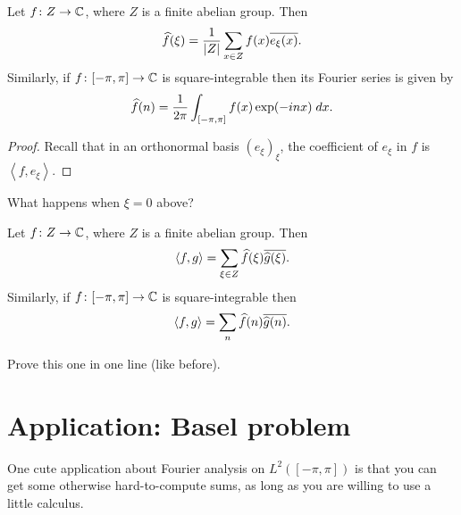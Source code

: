 \begin{corollary}
	Let $f \colon Z \to \mathbb C$, where $Z$ is a finite abelian group.
	Then \[ \widehat f(\xi) = \frac{1}{|Z|} \sum_{x \in Z} f(x) \overline{e_\xi(x)}. \]
	Similarly, if $f \colon [-\pi, \pi] \to \mathbb C$ is square-integrable then
	its Fourier series is given by
	\[ \widehat f(n) = \frac{1}{2\pi} \int_{[-\pi, \pi]} f(x) \exp(-inx) \; dx. \]
\end{corollary}
\begin{proof}
Recall that in an orthonormal basis $(e_\xi)_\xi$,
the coefficient of $e_\xi$ in $f$ is $\left< f, e_\xi\right>$.
\end{proof}
\begin{ques}
	What happens when $\xi = 0$ above?
\end{ques}

\begin{corollary}
	Let $f \colon Z \to \mathbb C$, where $Z$ is a finite abelian group.
	Then \[ \left< f,g \right> = \sum_{\xi \in Z} \widehat f(\xi) \overline{\widehat g(\xi)}. \]
	Similarly, if $f \colon [-\pi, \pi] \to \mathbb C$ is square-integrable then
	\[ \left< f,g \right> = \sum_n \widehat f(n) \overline{\widehat g(n)}. \]
\end{corollary}
\begin{ques}
	Prove this one in one line (like before).
\end{ques}

\section{Application: Basel problem}
One cute application about Fourier analysis on $L^2([-\pi, \pi])$
is that you can get some otherwise hard-to-compute sums,
as long as you are willing to use a little calculus.

